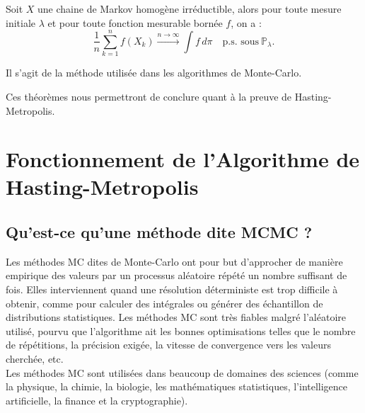 \documentclass{article}
\begin{document}
\begin{tcolorbox}[colback=white,colframe=blue!80!black,title=Convergence des méthodes de Monte-Carlo]
Soit $X$ une chaine de Markov homogène irréductible, alors pour toute mesure initiale $\lambda$ et pour toute fonction mesurable bornée $f$, on a :
\[
\frac{1}{n} \sum_{k=1}^{n} f(X_k) \xrightarrow{n \to \infty} \int f \, d\pi \quad \text{p.s. sous} \ \mathbb{P}_\lambda.
\]

Il s'agit de la méthode utilisée dans les algorithmes de Monte-Carlo.
\end{tcolorbox}
  
Ces théorèmes nous permettront de conclure quant à la preuve de Hasting-Metropolis.

\newpage %
\section{Fonctionnement de l'Algorithme de Hasting-Metropolis}

\subsection{Qu'est-ce qu'une méthode dite MCMC ?}

Les méthodes MC dites de Monte-Carlo ont pour but d'approcher de manière empirique des valeurs par un processus aléatoire répété un nombre suffisant de fois. Elles interviennent quand une résolution déterministe est trop difficile à obtenir, comme pour calculer des intégrales ou générer des échantillon de distributions statistiques. Les méthodes MC sont très fiables malgré l'aléatoire utilisé, pourvu que l'algorithme ait les bonnes optimisations telles que le nombre de répétitions, la précision exigée, la vitesse de convergence vers les valeurs cherchée, etc. \\
Les méthodes MC sont utilisées dans beaucoup de domaines des sciences (comme la physique, la chimie, la biologie, les mathématiques statistiques, l'intelligence artificielle, la finance et la cryptographie). \\
\end{document}
